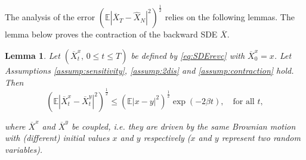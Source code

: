 \documentclass[letterpaper,11pt,reqno]{amsart}
\newtheorem{lemma}[theorem]{Lemma}
\numberwithin{equation}{section}
\begin{document}
The analysis of the error $\left(\mathbb{E}|\overline{X}_T - \widehat{X}_N|^2\right)^{\frac{1}{2}}$
relies on the following lemmas. 
The lemma below proves the contraction of the backward SDE $\overline{X}$.
\begin{lemma}
\label{lem:contraction}
Let $(\overline{X}^x_t, \, 0 \le t \le T)$
be defined by \eqref{eq:SDErevc} with $\overline{X}^x_0 = x$.
Let Assumptions \ref{assump:sensitivity}, \ref{assump:2dis} and \ref{assump:contraction} hold.
Then
\begin{equation}
\label{eq:contraction}
\left(\mathbb{E}|\overline{X}^x_t - \overline{X}^y_t|^2\right)^{\frac{1}{2}}
\le \left(\mathbb{E}|x - y|^2\right)^{\frac{1}{2}} \exp(- 2 \beta t), \quad \mbox{for all } t,
\end{equation}

where $\overline{X}^x$ and $\overline{X}^y$ be coupled, i.e.
they are driven by the same Brownian motion with (different) initial values $x$ and $y$ respectively ($x$ and $y$ represent two random variables).
\end{lemma}
\end{document}
